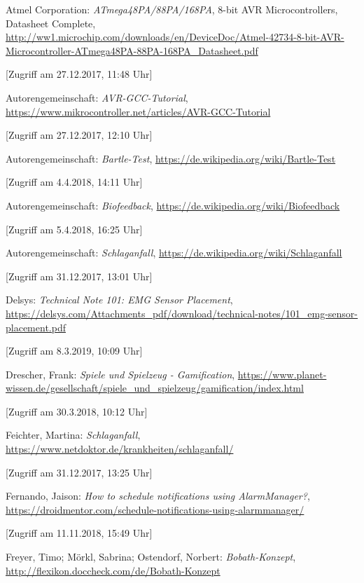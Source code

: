 \begin{thebibliography}{xxxxxx}
 Atmel Corporation: \textit{ATmega48PA/88PA/168PA}, 8-bit AVR Microcontrollers, Datasheet Complete, \url{http://ww1.microchip.com/downloads/en/DeviceDoc/Atmel-42734-8-bit-AVR-Microcontroller-ATmega48PA-88PA-168PA_Datasheet.pdf} 

[Zugriff am 27.12.2017, 11:48 Uhr]

 Autorengemeinschaft: \textit{AVR-GCC-Tutorial}, \url{https://www.mikrocontroller.net/articles/AVR-GCC-Tutorial}

[Zugriff am 27.12.2017, 12:10 Uhr]

 Autorengemeinschaft: \textit{Bartle-Test}, \url{https://de.wikipedia.org/wiki/Bartle-Test}

[Zugriff am 4.4.2018, 14:11 Uhr]

 Autorengemeinschaft: \textit{Biofeedback}, \url{https://de.wikipedia.org/wiki/Biofeedback}

[Zugriff am 5.4.2018, 16:25 Uhr]

 Autorengemeinschaft: \textit{Schlaganfall}, \url{https://de.wikipedia.org/wiki/Schlaganfall}

[Zugriff am 31.12.2017, 13:01 Uhr]

 Delsys: \textit{Technical Note 101: EMG Sensor Placement}, \url{https://delsys.com/Attachments_pdf/download/technical-notes/101_emg-sensor-placement.pdf}

[Zugriff am 8.3.2019, 10:09 Uhr]

 Drescher, Frank: \textit{Spiele und Spielzeug - Gamification}, \url{https://www.planet-wissen.de/gesellschaft/spiele_und_spielzeug/gamification/index.html}

[Zugriff am 30.3.2018, 10:12 Uhr]

 Feichter, Martina: \textit{Schlaganfall}, \url{https://www.netdoktor.de/krankheiten/schlaganfall/}

[Zugriff am 31.12.2017, 13:25 Uhr]

 Fernando, Jaison: \textit{How to schedule notifications using AlarmManager?}, \url{https://droidmentor.com/schedule-notifications-using-alarmmanager/}

[Zugriff am 11.11.2018, 15:49 Uhr]

 Freyer, Timo; Mörkl, Sabrina; Ostendorf, Norbert: \textit{Bobath-Konzept}, \url{http://flexikon.doccheck.com/de/Bobath-Konzept}


\end{thebibliography}
